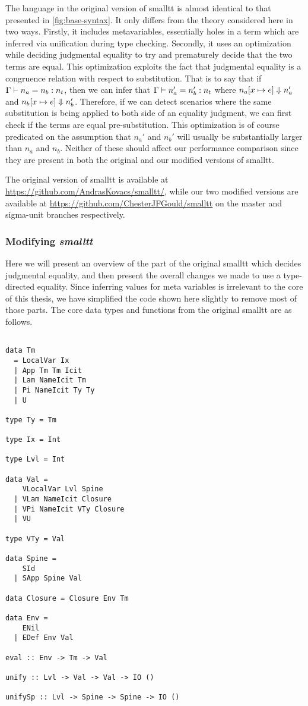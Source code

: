 The language in the original version of smalltt is almost identical to that presented in \autoref{fig:base-syntax}.
It only differs from the theory considered here in two ways.
Firstly, it includes metavariables, essentially holes in a term which are inferred via unification during type checking.
Secondly, it uses an optimization while deciding judgmental equality to try and prematurely decide that the two terms are equal.
This optimization exploits the fact that judgmental equality is a congruence relation with respect to substitution.
That is to say that if $\Gamma \vdash n_a = n_b : n_t$, then we can infer that $\Gamma \vdash n_a' = n_b' : n_t$ where $n_a [x \mapsto e] \Downarrow n_a'$ and $n_b [x \mapsto e] \Downarrow n_b'$.
Therefore, if we can detect scenarios where the same substitution is being applied to both side of an equality judgment, we can first check if the terms are equal pre-substitution.
This optimization is of course predicated on the assumption that $n_a'$ and $n_b'$ will usually be substantially larger than $n_a$ and $n_b$.
Neither of these should affect our performance comparison since they are present in both the original and our modified versions of smalltt.

The original version of smalltt is available at \url{https://github.com/AndrasKovacs/smalltt/}, while our two modified versions are available at \url{https://github.com/ChesterJFGould/smalltt} on the master and sigma-unit branches respectively.

\subsubsection{Modifying \textit{smalltt}}

Here we will present an overview of the part of the original smalltt which decides judgmental equality, and then present the overall changes we made to use a type-directed equality.
Since inferring values for meta variables is irrelevant to the core of this thesis, we have simplified the code shown here slightly to remove most of those parts.
The core data types and functions from the original smalltt are as follows.

\newpage

\begin{lstlisting}

data Tm
  = LocalVar Ix
  | App Tm Tm Icit
  | Lam NameIcit Tm
  | Pi NameIcit Ty Ty
  | U

type Ty = Tm

type Ix = Int

type Lvl = Int

data Val =
    VLocalVar Lvl Spine
  | VLam NameIcit Closure
  | VPi NameIcit VTy Closure
  | VU

type VTy = Val

data Spine =
    SId
  | SApp Spine Val

data Closure = Closure Env Tm

data Env =
    ENil
  | EDef Env Val

eval :: Env -> Tm -> Val

unify :: Lvl -> Val -> Val -> IO ()

unifySp :: Lvl -> Spine -> Spine -> IO ()
\end{lstlisting}

